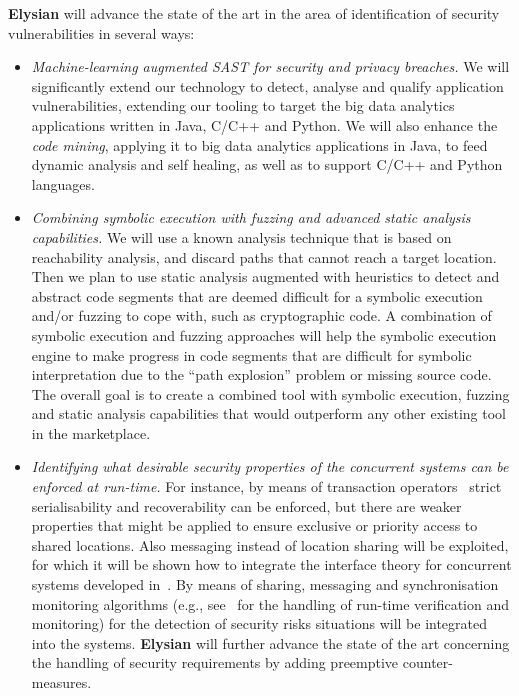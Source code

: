 \documentclass[a4paper,11pt]{article}
\newcommand{\project}[1]{\textbf{#1}\xspace}
\newcommand{\SECURITY}{\project{Elysian}}
\newcommand{\TheProject}{\SECURITY}
\begin{document}
\begin{mdframed}[backgroundcolor=gray!10]
\TheProject{} will advance the state of the art in the area of identification of security vulnerabilities in several ways:
\begin{itemize}
\item \emph{Machine-learning augmented SAST for security and privacy breaches.} We will significantly extend our technology to detect, analyse and qualify application vulnerabilities, extending our tooling to target the big data analytics applications written in Java, C/C++ and Python. We will also enhance the \emph{code mining}, applying it to big data analytics applications in Java, to feed dynamic analysis and self healing, as well as to support C/C++ and Python languages.
\item \emph{Combining symbolic execution with fuzzing and advanced static analysis capabilities.} We will use a known analysis technique that is based on reachability analysis, and discard paths that cannot reach a target location. Then we plan to use static analysis augmented with heuristics to detect and abstract code segments that are deemed difficult for a symbolic execution and/or fuzzing to cope with, such as cryptographic code. A combination of symbolic execution and fuzzing approaches will help the symbolic execution engine to make progress in code segments that are difficult for symbolic interpretation due to the “path explosion” problem or missing source code. The overall goal is to create a combined tool with symbolic execution, fuzzing and static analysis capabilities that would outperform any other existing tool in the marketplace.
\item \emph{Identifying what desirable security properties of the concurrent systems can be enforced at run-time.} For instance, by means of transaction operators~\cite{BorgerSW16} strict serialisability and recoverability can be enforced, but there are weaker properties that might be applied to ensure exclusive or priority access to shared locations. Also messaging instead of location sharing will be exploited, for which it will be shown how to integrate the interface theory for concurrent systems developed in~\cite{BauerHW11}. By means of sharing, messaging and synchronisation monitoring algorithms (e.g., see~\cite{DiekertL14} for the handling of run-time verification and monitoring) for the detection of security risks situations will be integrated into the systems. \TheProject{} will further advance the state of the art concerning the handling of security requirements by adding preemptive counter-measures.
\end{itemize}
\end{mdframed}
\end{document}
